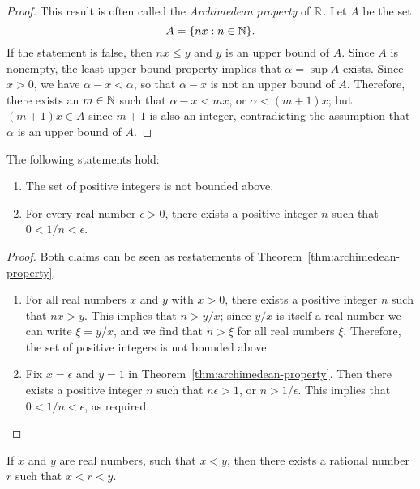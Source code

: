 \begin{proof}
    This result is often called the \emph{Archimedean property} of \(\mathbb{R}\). Let \(A\) be the set
    \[
        A = \{nx : n \in \mathbb{N}\}.
    \]
    If the statement is false, then \(nx \leq y\) and \(y\) is an upper bound of \(A\). Since \(A\) is nonempty, the least upper bound property implies that \(\alpha = \sup A\) exists. Since \(x > 0\), we have \(\alpha - x < \alpha\), so that \(\alpha - x\) is not an upper bound of \(A\). Therefore, there exists an \(m \in \mathbb{N}\) such that \(\alpha - x < mx\), or \(\alpha < (m + 1)x\); but \((m + 1)x \in A\) since \(m + 1\) is also an integer, contradicting the assumption that \(\alpha\) is an upper bound of \(A\).
\end{proof}

\begin{corollary}
    \label{cor:archimedean-property}
    The following statements hold:
    \begin{enumerate}[label=\normalfont{(\alph*)}]
        \item The set of positive integers is not bounded above.
        \item For every real number \(\epsilon > 0\), there exists a positive integer \(n\) such that \(0 < 1/n < \epsilon\).
    \end{enumerate}
\end{corollary}

\begin{proof}
    Both claims can be seen as restatements of Theorem~\ref{thm:archimedean-property}.

    \begin{enumerate}[label=(\alph*), wide]
        \item For all real numbers \(x\) and \(y\) with \(x > 0\), there exists a positive integer \(n\) such that \(nx > y\). This implies that \(n > y/x\); since \(y/x\) is itself a real number we can write \(\xi = y/x\), and we find that \(n > \xi\) for all real numbers \(\xi\). Therefore, the set of positive integers is not bounded above.
        
        \item Fix \(x = \epsilon\) and \(y = 1\) in Theorem~\ref{thm:archimedean-property}. Then there exists a positive integer \(n\) such that \(n\epsilon > 1\), or \(n > 1/\epsilon\). This implies that \(0 < 1/n < \epsilon\), as required.
    \end{enumerate}
\end{proof}

\begin{theorem}
    \label{thm:q-is-dense-in-r}
    If \(x\) and \(y\) are real numbers, such that \(x < y\), then there exists a rational number \(r\) such that \(x < r < y\).
\end{theorem}

